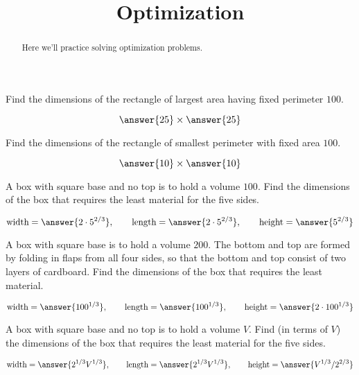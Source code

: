 \documentclass[handout]{ximera}
\title[Exercises:]{Optimization}
\begin{document}
\begin{abstract}
  Here we'll practice solving optimization problems.
\end{abstract}
\maketitle

\begin{exercise}
  Find the dimensions of the rectangle of largest area having fixed
  perimeter $100$.
  \begin{prompt}
  \[
  \answer{25}\times \answer{25}
  \]
  \end{prompt}
\end{exercise}

\begin{exercise}
 Find the dimensions of the rectangle of smallest perimeter with fixed area $100$.
  \begin{prompt}
  \[
  \answer{10}\times \answer{10}
  \]
  \end{prompt}
\end{exercise}

\begin{exercise}
A box with square base and no top is to hold a volume $100$.  Find
  the dimensions of the box that requires the least material for the
  five sides.
  \begin{prompt}
  \[
  \text{width}=\answer{2\cdot 5^{2/3}},\qquad
  \text{length}=\answer{2\cdot 5^{2/3}},\qquad
  \text{height}=\answer{5^{2/3}}
  \]
  \end{prompt}
\end{exercise}

\begin{exercise}
A box with square base is to hold a volume $200$. The bottom and top
  are formed by folding in flaps from all four sides, so that the
  bottom and top consist of two layers of cardboard.  Find the
  dimensions of the box that requires the least material.
  \begin{prompt}
  \[
  \text{width}=\answer{100^{1/3}},\qquad
  \text{length}=\answer{100^{1/3}},\qquad
  \text{height}=\answer{2\cdot 100^{1/3}}
  \]
  \end{prompt}
\end{exercise}

\begin{exercise}
A box with square base and no top is to hold a volume $V$.  Find (in
  terms of $V$) the dimensions of the box that requires the least
  material for the five sides.
  \begin{prompt}
  \[
  \text{width}=\answer{2^{1/3}V^{1/3}},\qquad
  \text{length}=\answer{2^{1/3}V^{1/3}},\qquad
  \text{height}=\answer{V^{1/3}/2^{2/3}}
  \]
  \end{prompt}
\end{exercise}
\end{document}
